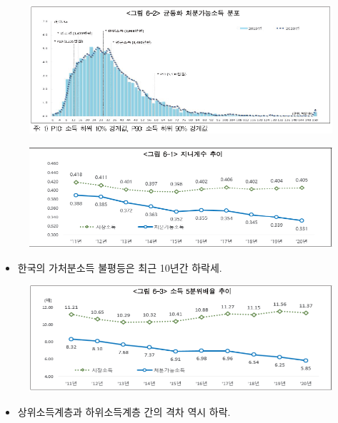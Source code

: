 \documentclass[aspectratio=169,xcolor=dvipsnames,handout]{beamer}
\begin{document}

\begin{frame}[<+->]
    \begin{figure}
        \centering
        \includegraphics[width=.9\textwidth]{pic/incomedist.png}
    \end{figure}
\end{frame}

\begin{frame}[<+->]
    \begin{figure}
        \centering
        \includegraphics[width=.9\textwidth]{pic/gini_11-20.png}
    \end{figure}
    \begin{itemize}
        \item 한국의 가처분소득 불평등은 최근 10년간 하락세.
    \end{itemize}
\end{frame}

\begin{frame}[<+->]
    \begin{figure}
        \centering
        \includegraphics[width=.9\textwidth]{pic/1to5ratio.png}
    \end{figure}
    \begin{itemize}
        \item 상위소득계층과 하위소득계층 간의 격차 역시 하락.
    \end{itemize}
\end{frame}
\end{document}
